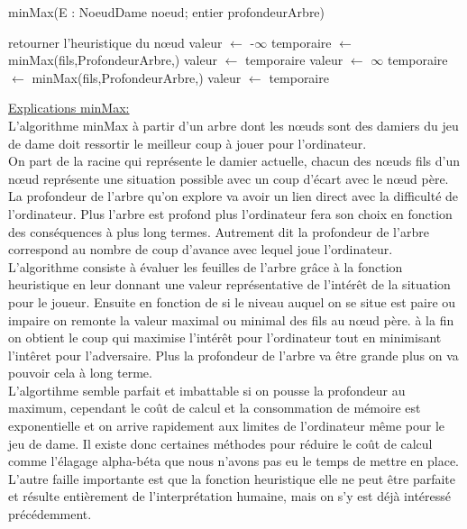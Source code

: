\documentclass[12,french]{report}
\begin{document}
\begin{algorithm}
	\caption{minMax(E : NoeudDame noeud; entier profondeurArbre)}
	\begin{algorithmic}
		\State retourner l'heuristique du nœud
	\EndIf
		\State valeur $\leftarrow$ -$\infty$
			\State temporaire $\leftarrow$ minMax(fils,ProfondeurArbre,)
				\State valeur $\leftarrow$ temporaire
			\EndIf
		\EndFor
	\Else
		\State valeur $\leftarrow$ $\infty$
		\State temporaire $\leftarrow$ minMax(fils,ProfondeurArbre,)
			\State valeur $\leftarrow$ temporaire
		\EndIf
	\EndIf
	\end{algorithmic}
\end{algorithm}

\pagebreak

\underline{Explications minMax:}\\

L'algorithme minMax à partir d'un arbre dont les nœuds sont des damiers du jeu de dame doit ressortir le meilleur coup à jouer pour l'ordinateur.\\
On part de la racine qui représente le damier actuelle, chacun des nœuds fils d'un nœud représente une situation possible avec un coup d'écart avec le nœud père. La profondeur de l'arbre qu'on explore va avoir un lien direct avec la difficulté de l'ordinateur. Plus l'arbre est profond plus l'ordinateur fera son choix en fonction des conséquences à plus long termes. Autrement dit la profondeur de l'arbre correspond au nombre de coup d'avance avec lequel joue l'ordinateur. \\
L'algorithme consiste à évaluer les feuilles de l'arbre grâce à la fonction heuristique en leur donnant une valeur représentative de l'intérêt de la situation pour le joueur. Ensuite en fonction de si le niveau auquel on se situe  est paire ou impaire on remonte la valeur maximal ou minimal des fils au nœud père. à la fin on obtient le coup qui maximise l'intérêt pour l'ordinateur tout en minimisant l'intêret pour l'adversaire. Plus la profondeur de l'arbre va être grande plus on va pouvoir cela à long terme.\\
L'algortihme semble parfait et imbattable si on pousse la profondeur au maximum, cependant le coût de calcul et la consommation de mémoire est exponentielle et on arrive rapidement aux limites de l'ordinateur même pour le jeu de dame. Il existe donc certaines méthodes pour réduire le coût de calcul comme l'élagage alpha-béta que nous n'avons pas eu le temps de mettre en place.
L'autre faille importante est que la fonction heuristique elle ne peut être parfaite et résulte entièrement de l'interprétation humaine, mais on s'y est déjà intéressé précédemment.
\end{document}

